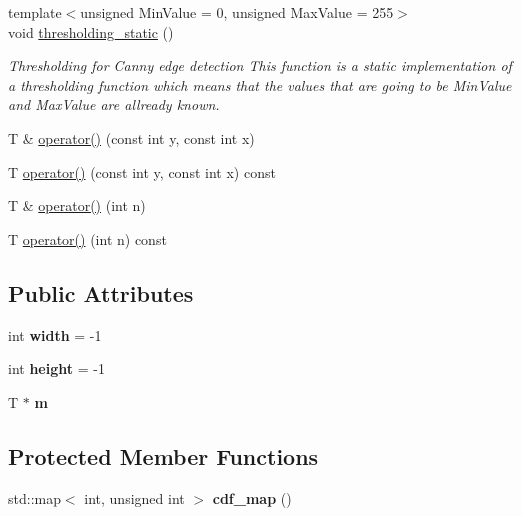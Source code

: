 \begin{DoxyCompactItemize}
{\footnotesize template$<$unsigned Min\+Value = 0, unsigned Max\+Value = 255$>$ }\\void \mbox{\hyperlink{classed_1_1matrix_a9188ac4fe9ddc17b80e9b7865f3efe12}{thresholding\+\_\+static}} ()
\begin{DoxyCompactList}\small\item\em Thresholding for Canny edge detection This function is a static implementation of a thresholding function which means that the values that are going to be Min\+Value and Max\+Value are allready known. \end{DoxyCompactList}\item 
T \& \mbox{\hyperlink{classed_1_1matrix_a958041dd0f380db0f0b60f85b736b020}{operator()}} (const int y, const int x)
\item 
T \mbox{\hyperlink{classed_1_1matrix_a6c184e083e3849cb0804915300d68cad}{operator()}} (const int y, const int x) const
\item 
T \& \mbox{\hyperlink{classed_1_1matrix_aee4710cd7dd60dc960087bc3466d2881}{operator()}} (int n)
\item 
T \mbox{\hyperlink{classed_1_1matrix_ac3928d0287a81060742db500412e530e}{operator()}} (int n) const
\end{DoxyCompactItemize}
\subsection*{Public Attributes}
\begin{DoxyCompactItemize}
\item 
\mbox{\label{classed_1_1matrix_a57e56f840d1afa119dadee00c909b126}} 
int {\bfseries width} = -\/1
\item 
\mbox{\label{classed_1_1matrix_ac5c960e6811fc4f17a465e31dc216c49}} 
int {\bfseries height} = -\/1
\item 
\mbox{\label{classed_1_1matrix_ad97cb578ebad45bf4fc7925379a3fa9f}} 
T $\ast$ {\bfseries m}
\end{DoxyCompactItemize}
\subsection*{Protected Member Functions}
\begin{DoxyCompactItemize}
\item 
\mbox{\label{classed_1_1matrix_a1f388c37205e6d5443b074719cedd7d9}} 
std\+::map$<$ int, unsigned int $>$ {\bfseries cdf\+\_\+map} ()
\end{DoxyCompactItemize}


